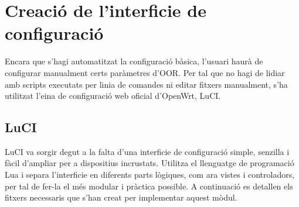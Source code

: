 \documentclass[11pt]{article}
\begin{document}
\section{Creació de l’interficie de configuració}
Encara que s’hagi automatitzat la configuració bàsica, l’usuari haurà de configurar manualment certs paràmetres d’OOR. Per tal que no hagi de lidiar amb scripts executats per linia de comandes ni editar fitxers manualment, s’ha utilitzat l’eina de configuració web oficial d’OpenWrt, LuCI.
\subsection{LuCI}
LuCI va sorgir degut a la falta d’una interficie de configuració simple, senzilla i fàcil d’ampliar per a dispositius incrustats. Utilitza el llenguatge de programació Lua i separa l’interficie en diferents parts lògiques, com ara vistes i controladors, per tal de fer-la el més modular i pràctica possible.
A continuació es detallen els fitxers necessaris que s’han creat per implementar aquest mòdul.
\end{document}

